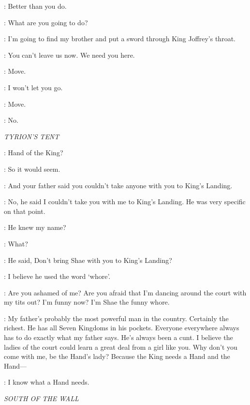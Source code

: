 \JON: Better than you do. 

\SAM: What are you going to do? 

\JON: I'm going to find my brother and put a sword through King Joffrey's throat. 

\SAM: You can't leave us now. We need you here. 

\JON: Move. 

\SAM: I won't let you go. 

\JON: Move. 

\enlargethispage*{20pt}
\SAM: No. 


\scene

\textit{TYRION'S TENT}


\SHAE: Hand of the King? 

\TYRION: So it would seem. 

\SHAE: And your father said you couldn't take anyone with you to King's Landing. 

\TYRION: No, he said I couldn't take you with me to King's Landing. He was very specific on that point. 

\SHAE: He knew my name? 

\TYRION: What? 

\SHAE: He said, Don't bring Shae with you to King's Landing? 

\TYRION: I believe he used the word `whore'. 

\SHAE: Are you ashamed of me? Are you afraid that I'm dancing around the court with my tits out? I'm funny now? I'm Shae the funny whore. 

\TYRION: My father's probably the most powerful man in the country. Certainly the richest. He has all Seven Kingdoms in his pockets. Everyone everywhere always has to do exactly what my father says. He's always been a cunt. I believe the ladies of the court could learn a great deal from a girl like you. Why don't you come with me, be the Hand's lady? Because the King needs a Hand and the Hand--- 

\SHAE: I know what a Hand needs. 


\scene

\textit{SOUTH OF THE WALL}


